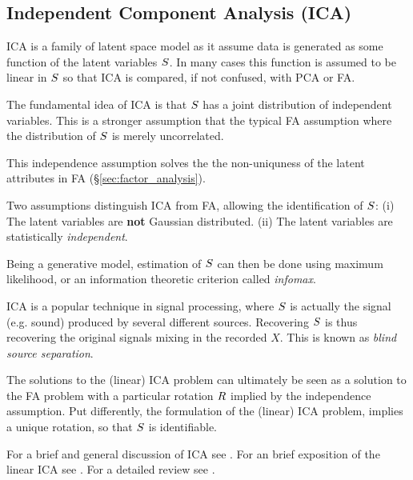 \subsection{Independent Component Analysis (ICA)}
\label{sec:ica}

ICA is a family of latent space model as it assume data is generated as some function of the latent variables $S$. 
In many cases this function is assumed to be linear in $S$ so that ICA is compared, if not confused, with PCA or FA. 

The fundamental idea of ICA is that $S$ has a joint distribution of independent variables. 
This is a stronger assumption that the typical FA assumption where the distribution of $S$ is merely uncorrelated. 

This independence assumption solves the the non-uniquness of the latent attributes in FA (\S\ref{sec:factor_analysis}).

Two assumptions distinguish ICA from FA, allowing the identification of $S$: 
(i) The latent variables are \textbf{not} Gaussian distributed.
(ii) The latent variables are statistically \emph{independent}.

Being a generative model, estimation of $S$ can then be done using maximum likelihood, or an information theoretic criterion called \emph{infomax}.


\begin{remark}
ICA is a popular technique in signal processing, where $S$ is actually the signal (e.g. sound) produced by several different sources. 
Recovering $S$ is thus recovering the original signals mixing in the recorded $X$. This is known as \emph{blind source separation}.
\end{remark}


\begin{remark}
The solutions to the (linear) ICA problem can ultimately be seen as a solution to the FA problem with a particular rotation $R$ implied by the independence assumption.
Put differently, the formulation of the (linear) ICA problem, implies a unique rotation, so that $S$ is identifiable. 
\end{remark}

For a brief and general discussion of ICA see \cite{jolliffe_principal_2002}.
For an brief exposition of the linear ICA see \cite{hastie_elements_2003}. 
For a detailed review see \cite{hyvarinen_independent_2000}. 



